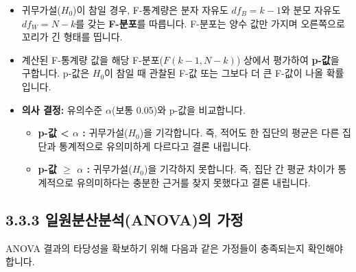 \documentclass[
  letterpaper,
]{book}
\providecommand{\tightlist}{%
  \setlength{\itemsep}{0pt}\setlength{\parskip}{0pt}}
\begin{document}
\begin{itemize}
\tightlist
\item
  귀무가설(\(H_0\))이 참일 경우, F-통계량은 분자 자유도 \(df_B = k-1\)와
  분모 자유도 \(df_W = N-k\)를 갖는 \textbf{F-분포}를 따릅니다. F-분포는
  양수 값만 가지며 오른쪽으로 꼬리가 긴 형태를 띱니다.
\item
  계산된 F-통계량 값을 해당 F-분포(\(F(k-1, N-k)\)) 상에서 평가하여
  \textbf{p-값}을 구합니다. p-값은 \(H_0\)이 참일 때 관찰된 F-값 또는
  그보다 더 큰 F-값이 나올 확률입니다.
\item
  \textbf{의사 결정:} 유의수준 \(\alpha\)(보통 0.05)와 p-값을
  비교합니다.

  \begin{itemize}
  \tightlist
  \item
    \textbf{p-값 \textless{} \(\alpha\) :} 귀무가설(\(H_0\))을
    기각합니다. 즉, 적어도 한 집단의 평균은 다른 집단과 통계적으로
    유의미하게 다르다고 결론 내립니다.
  \item
    \textbf{p-값 \(\ge\) \(\alpha\) :} 귀무가설(\(H_0\))을 기각하지
    못합니다. 즉, 집단 간 평균 차이가 통계적으로 유의미하다는 충분한
    근거를 찾지 못했다고 결론 내립니다.
  \end{itemize}
\end{itemize}

\subsection{3.3.3 일원분산분석(ANOVA)의
가정}\label{uxc77cuxc6d0uxbd84uxc0b0uxbd84uxc11danovauxc758-uxac00uxc815}

ANOVA 결과의 타당성을 확보하기 위해 다음과 같은 가정들이 충족되는지
확인해야 합니다.
\end{document}
